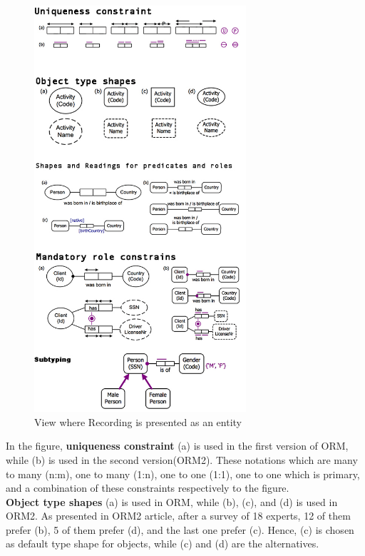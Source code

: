 \begin{figure}
    \centering
    \includegraphics[width=0.7\textwidth]{Figures/USEDORM.png}
    \caption{View where Recording is presented as an entity}
    \label{fig:Figures/USEDORM}
\end{figure}
In the figure, \textbf{uniqueness constraint} (a) is used in the first version of ORM, while (b) is used in the second version(ORM2). These notations which are many to many (n:m), one to many (1:n), one to one (1:1), one to one which is primary, and a combination of these constraints respectively to the figure.\\
\textbf{Object type shapes} (a) is used in ORM, while (b), (c), and (d) is used in ORM2. As presented in ORM2 article\citep{ORMdotNET2}, after a survey of 18 experts, 12 of them prefer (b), 5 of them prefer (d), and the last one prefer (c). Hence, (c) is chosen as default type shape for objects, while (c) and (d) are the alternatives.\\
